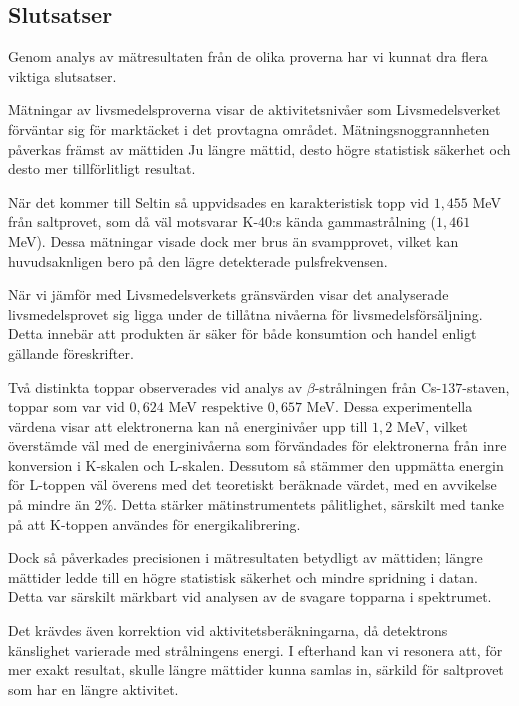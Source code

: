\subsection{Slutsatser} \label{sec:conclusions}

Genom analys av mätresultaten från de olika proverna har vi kunnat dra flera viktiga slutsatser. 

\indent

Mätningar av livsmedelsproverna visar de aktivitetsnivåer som Livsmedelsverket \parencite{livsmedelsverket} förväntar sig för marktäcket i det provtagna området. 
Mätningsnoggrannheten påverkas främst av mättiden Ju längre mättid, desto högre statistisk säkerhet och desto mer tillförlitligt resultat.

När det kommer till Seltin så uppvidsades en karakteristisk topp vid $1,455$ MeV från saltprovet, som då väl motsvarar K-$40$:s kända gammastrålning ($1,461$ MeV).
Dessa mätningar visade dock mer brus än svampprovet, vilket kan huvudsaknligen bero på den lägre detekterade pulsfrekvensen.

\indent

När vi jämför med Livsmedelsverkets gränsvärden visar det analyserade livsmedelsprovet sig ligga under de tillåtna nivåerna för livsmedelsförsäljning. Detta innebär att produkten är säker för både konsumtion och handel enligt gällande föreskrifter.


Två distinkta toppar observerades vid analys av $\beta$-strålningen från Cs-$137$-staven, toppar som var vid $0,624$ MeV respektive $0,657$ MeV. Dessa experimentella värdena visar att elektronerna kan nå energinivåer upp till $1,2$ MeV, vilket överstämde väl med de energinivåerna som förvändades för elektronerna från inre konversion i K-skalen och L-skalen.
Dessutom så stämmer den uppmätta energin för L-toppen väl överens med det teoretiskt beräknade värdet, med en avvikelse på mindre än 2$\%$. Detta stärker mätinstrumentets pålitlighet, särskilt med tanke på att K-toppen användes för energikalibrering.

\indent

Dock så påverkades precisionen i mätresultaten betydligt av mättiden; längre mättider ledde till en högre statistisk säkerhet och mindre spridning i datan. Detta var särskilt märkbart vid analysen av de svagare topparna i spektrumet.

Det krävdes även korrektion vid aktivitetsberäkningarna, då detektrons känslighet varierade med strålningens energi. I efterhand kan vi resonera att, för mer exakt resultat, skulle längre mättider kunna samlas in, särkild för saltprovet som har en längre aktivitet.


